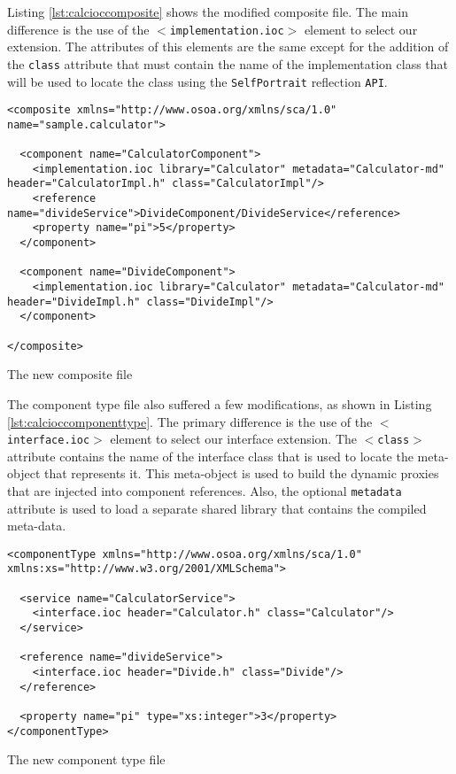 Listing \ref{lst:calcioccomposite} shows the modified composite file. The main difference
is the use of the \texttt{$<$implementation.ioc$>$} element to select our extension. The attributes
of this elements are the same except for the addition of the \texttt{class} attribute that must
contain the name of the implementation class that will be used to locate the class using the
\texttt{SelfPortrait} reflection \texttt{API}.

\begin{listing}
\begin{verbatim}
<composite xmlns="http://www.osoa.org/xmlns/sca/1.0" name="sample.calculator">

  <component name="CalculatorComponent">
    <implementation.ioc library="Calculator" metadata="Calculator-md" header="CalculatorImpl.h" class="CalculatorImpl"/>
    <reference name="divideService">DivideComponent/DivideService</reference>
    <property name="pi">5</property>
  </component>
        
  <component name="DivideComponent">
    <implementation.ioc library="Calculator" metadata="Calculator-md" header="DivideImpl.h" class="DivideImpl"/>
  </component>

</composite>
\end{verbatim}
\caption{The new composite file}
\label{lst:calcioccomposite}
\end{listing}

The component type file also suffered a few modifications, as shown in Listing \ref{lst:calcioccomponenttype}.
The primary difference is the use of the \texttt{$<$interface.ioc$>$} element to select our interface extension.
The \texttt{$<$class$>$} attribute contains the name of the interface class that is used to locate the
meta-object that represents it. This meta-object is used to build the dynamic proxies that are injected into
component references. Also, the optional \texttt{metadata} attribute is used to load a separate shared library
that contains the compiled meta-data.

\begin{listing}
\begin{verbatim}
<componentType xmlns="http://www.osoa.org/xmlns/sca/1.0" xmlns:xs="http://www.w3.org/2001/XMLSchema">

  <service name="CalculatorService">
    <interface.ioc header="Calculator.h" class="Calculator"/>
  </service>

  <reference name="divideService">
    <interface.ioc header="Divide.h" class="Divide"/>
  </reference>
  
  <property name="pi" type="xs:integer">3</property>
</componentType>
\end{verbatim}
\caption{The new component type file}
\label{lst:calcioccomponenttype}
\end{listing}

